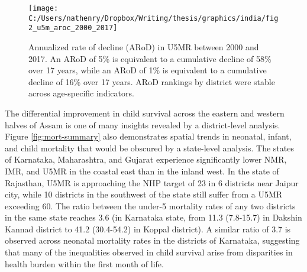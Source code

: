 \documentclass[
]{article}
\begin{document}
\begin{figure}[!hbt]

{\centering \texttt{[image: C:/Users/nathenry/Dropbox/Writing/thesis/graphics/india/fig2\_u5m\_aroc\_2000\_2017]} 

}

\caption{Annualized rate of decline (ARoD) in U5MR between 2000 and 2017. An ARoD of 5\% is equivalent to a cumulative decline of 58\% over 17 years, while an ARoD of 1\% is equivalent to a cumulative decline of 16\% over 17 years. ARoD rankings by district were stable across age-specific indicators.}\label{fig:aroc}
\end{figure}

The differential improvement in child survival across the eastern and western halves of Assam is one of many insights revealed by a district-level analysis. Figure \ref{fig:mort-summary} also demonstrates spatial trends in neonatal, infant, and child mortality that would be obscured by a state-level analysis. The states of Karnataka, Maharashtra, and Gujarat experience significantly lower NMR, IMR, and U5MR in the coastal east than in the inland west. In the state of Rajasthan, U5MR is approaching the NHP target of 23 in 6 districts near Jaipur city, while 10 districts in the southwest of the state still suffer from a U5MR exceeding 60. The ratio between the under-5 mortality rates of any two districts in the same state reaches 3.6 (in Karnataka state, from 11.3 (7.8-15.7) in Dakshin Kannad district to 41.2 (30.4-54.2) in Koppal district). A similar ratio of 3.7 is observed across neonatal mortality rates in the districts of Karnataka, suggesting that many of the inequalities observed in child survival arise from disparities in health burden within the first month of life.
\end{document}
